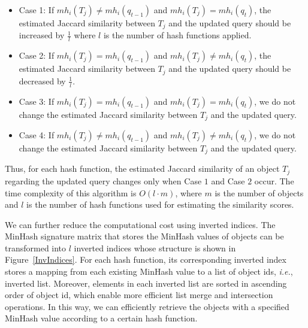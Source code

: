 \begin{itemize}
\item Case 1: If $mh_i(T_j) \neq mh_i(q_{t-1})$ and $mh_i(T_j) = mh_i(q_{t})$, the estimated Jaccard similarity between $T_j$ and the updated query should be increased by $\frac{1}{l}$ where $l$ is the number of hash functions applied. 
\item Case 2: If $mh_i(T_j) = mh_i(q_{t-1})$ and $mh_i(T_j) \neq mh_i(q_{t})$, the estimated Jaccard similarity between $T_j$ and the updated query should be decreased by $\frac{1}{l}$. 
\item Case 3: If $mh_i(T_j) = mh_i(q_{t-1})$ and $mh_i(T_j) = mh_i(q_{t})$, we do not change the estimated Jaccard similarity between $T_j$ and the updated query.
\item Case 4: If $mh_i(T_j) \neq mh_i(q_{t-1})$ and $mh_i(T_j) \neq mh_i(q_{t})$, we do not change the estimated Jaccard similarity between $T_j$ and the updated query.
\end{itemize} 


Thus, for each hash function, the estimated Jaccard similarity of an object $T_j$ regarding the updated query changes only when Case $1$ and Case $2$ occur.
The time complexity of this algorithm is $O(l\cdot m)$, where $m$ is the number of objects and $l$ is the number of hash functions used for estimating the similarity scores.   





We can further reduce the computational cost using inverted indices. The MinHash signature matrix that stores the MinHash values of objects can be transformed into $l$ inverted indices whose structure is shown in Figure~\ref{InvIndices}. For each hash function, its corresponding inverted index stores a mapping from each existing MinHash value to a list of object ids, \emph{i.e.}, inverted list. Moreover, elements in each inverted list are sorted in ascending order of object id, which enable more efficient list merge and intersection operations. In this way, we can efficiently retrieve the objects with a specified MinHash value according to a certain hash function. 

